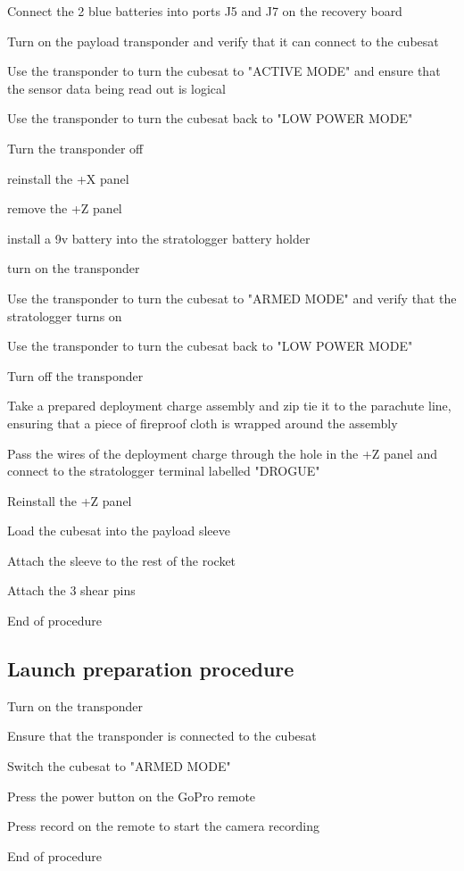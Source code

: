 \begin{checklist}
	\item Connect the 2 blue batteries into ports J5 and J7 on the recovery board
	\item Turn on the payload transponder and verify that it can connect to the cubesat
	\item Use the transponder to turn the cubesat to "ACTIVE MODE" and ensure that the sensor data being read out is logical
	\item Use the transponder to turn the cubesat back to "LOW POWER MODE"
	\item Turn the transponder off
	\item reinstall the +X panel
	\item remove the +Z panel
	\item install a 9v battery into the stratologger battery holder  
	\item turn on the transponder
	\item Use the transponder to turn the cubesat to "ARMED MODE" and verify that the stratologger turns on
	\item Use the transponder to turn the cubesat back to "LOW POWER MODE"
	\item Turn off the transponder
	\item Take a prepared deployment charge assembly and zip tie it to the parachute line, ensuring that a piece of fireproof cloth is wrapped around the assembly
	\item Pass the wires of the deployment charge through the hole in the +Z panel and connect to the stratologger terminal labelled "DROGUE" 
	\item Reinstall the +Z panel
	\item Load the cubesat into the payload sleeve
	\item Attach the sleeve to the rest of the rocket
	\item Attach the 3 shear pins 
	\item End of procedure
\end{checklist}
\setcounter{checklistnum}{0}

\newpage
\subsection{Launch preparation procedure}
\begin{checklist}
    	\item Turn on the transponder
	\item Ensure that the transponder is connected to the cubesat
	\item Switch the cubesat to "ARMED MODE"
	\item Press the power button on the GoPro remote
	\item Press record on the remote to start the camera recording
	\item End of procedure

\end{checklist}
\setcounter{checklistnum}{0}


